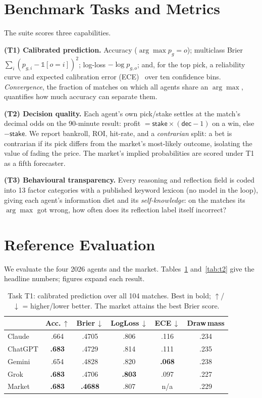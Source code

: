 \documentclass[sigconf,nonacm]{acmart}
\begin{document}
\section{Benchmark Tasks and Metrics}
\label{sec:tasks}
The suite scores three capabilities.

\textbf{(T1) Calibrated prediction.} Accuracy ($\arg\max p_g=o$); multiclass
Brier $\sum_i(p_{g,i}-\mathbb{1}[o{=}i])^2$; log-loss $-\log p_{g,o}$; and, for
the top pick, a reliability curve and expected calibration error
(ECE)~\cite{naeini2015ece} over ten confidence bins. \emph{Convergence}, the
fraction of matches on which all agents share an $\arg\max$, quantifies
how much accuracy can separate them.

\textbf{(T2) Decision quality.} Each agent's own pick/stake settles at the
match's decimal odds on the 90-minute result: profit $=\textsf{stake}\times(\textsf{dec}-1)$
on a win, else $-\textsf{stake}$. We report bankroll, ROI, hit-rate, and a
\emph{contrarian} split: a bet is contrarian if its pick differs from the
market's most-likely outcome, isolating the value of fading the price. The
market's implied probabilities are scored under T1 as a fifth forecaster.

\textbf{(T3) Behavioural transparency.} Every \textsf{reasoning} and reflection
field is coded into 13 factor categories with a published keyword lexicon (no
model in the loop), giving each agent's information diet and its
\emph{self-knowledge}: on the matches its $\arg\max$ got wrong, how often does
its reflection label itself \textsf{incorrect}?

\section{Reference Evaluation}
\label{sec:results}
We evaluate the four 2026 agents and the market. Tables~\ref{tab:t1}
and~\ref{tab:t2} give the headline numbers; figures expand each result.

\begin{table}[t]
\caption{Task T1: calibrated prediction over all 104 matches. Best in bold;
$\uparrow$/$\downarrow$ = higher/lower better. The market attains the best
Brier score.}
\label{tab:t1}
\small
\begin{tabular}{lccccc}
\toprule
& Acc.\,$\uparrow$ & Brier\,$\downarrow$ & LogLoss\,$\downarrow$ & ECE\,$\downarrow$ & Draw\,mass \\
\midrule
Claude   & .664 & .4705 & .806 & .116 & .234 \\
ChatGPT  & \textbf{.683} & .4729 & .814 & .111 & .235 \\
Gemini   & .654 & .4828 & .820 & \textbf{.068} & .238 \\
Grok     & \textbf{.683} & .4706 & \textbf{.803} & .097 & .227 \\
\midrule
Market   & \textbf{.683} & \textbf{.4688} & .807 & n/a & .229 \\
\bottomrule
\end{tabular}
\end{table}
\end{document}

